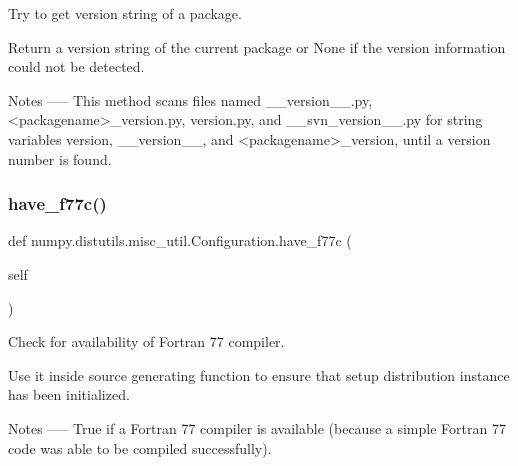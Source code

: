 \begin{DoxyVerb}Try to get version string of a package.

Return a version string of the current package or None if the version
information could not be detected.

Notes
-----
This method scans files named
__version__.py, <packagename>_version.py, version.py, and
__svn_version__.py for string variables version, __version__, and
<packagename>_version, until a version number is found.
\end{DoxyVerb}
 \mbox{\label{classnumpy_1_1distutils_1_1misc__util_1_1Configuration_a7449411f59dba30fd12e5d4d80147275}} 
\subsubsection{\texorpdfstring{have\+\_\+f77c()}{have\_f77c()}}
{\footnotesize\ttfamily def numpy.\+distutils.\+misc\+\_\+util.\+Configuration.\+have\+\_\+f77c (\begin{DoxyParamCaption}\item[{}]{self }\end{DoxyParamCaption})}

\begin{DoxyVerb}Check for availability of Fortran 77 compiler.

Use it inside source generating function to ensure that
setup distribution instance has been initialized.

Notes
-----
True if a Fortran 77 compiler is available (because a simple Fortran 77
code was able to be compiled successfully).
\end{DoxyVerb}
 \mbox{\label{classnumpy_1_1distutils_1_1misc__util_1_1Configuration_a3be96aeda2753efd0daf0bca3fe01e64}} 
